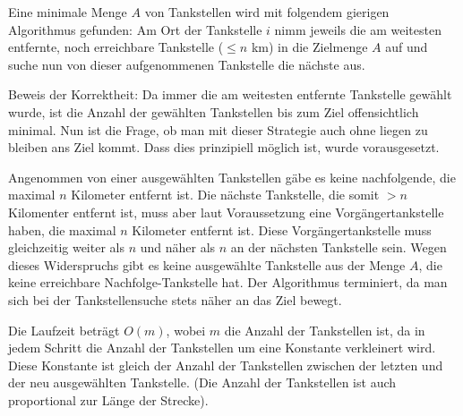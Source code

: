 \documentclass[a4paper,10pt]{scrartcl}
\begin{document}
Eine minimale Menge $A$ von Tankstellen wird mit folgendem gierigen Algorithmus gefunden:
Am Ort der Tankstelle $i$ nimm jeweils die am weitesten entfernte, noch
erreichbare Tankstelle ($\le n$ km) in die Zielmenge $A$ auf und suche
nun von dieser aufgenommenen Tankstelle die nächste aus.

Beweis der Korrektheit:
Da immer die am weitesten entfernte Tankstelle gewählt wurde, ist die Anzahl der gewählten Tankstellen bis zum Ziel offensichtlich minimal.
Nun ist die Frage, ob man mit dieser Strategie auch ohne liegen zu bleiben ans Ziel kommt. Dass dies prinzipiell möglich ist, wurde vorausgesetzt.

Angenommen von einer ausgewählten Tankstellen gäbe es keine
nachfolgende, die maximal $n$ Kilometer entfernt ist. Die nächste Tankstelle, die somit $> n$ Kilomenter entfernt ist, muss aber laut Voraussetzung eine
Vorgängertankstelle haben, die maximal $n$ Kilometer entfernt ist. Diese
Vorgängertankstelle muss gleichzeitig weiter als $n$ und näher als $n$
an der nächsten Tankstelle sein. Wegen dieses Widerspruchs
gibt es keine ausgewählte Tankstelle aus der Menge $A$, die keine erreichbare Nachfolge-Tankstelle hat.
Der Algorithmus terminiert, da man sich bei der Tankstellensuche stets näher an das Ziel bewegt.


Die Laufzeit beträgt $O(m)$, wobei $m$ die Anzahl der Tankstellen ist,
da in jedem Schritt die Anzahl der Tankstellen um eine Konstante
verkleinert wird. Diese Konstante ist gleich der Anzahl der Tankstellen
zwischen der letzten und der neu ausgewählten Tankstelle. (Die Anzahl der Tankstellen ist auch proportional zur Länge der Strecke).
\end{document}
